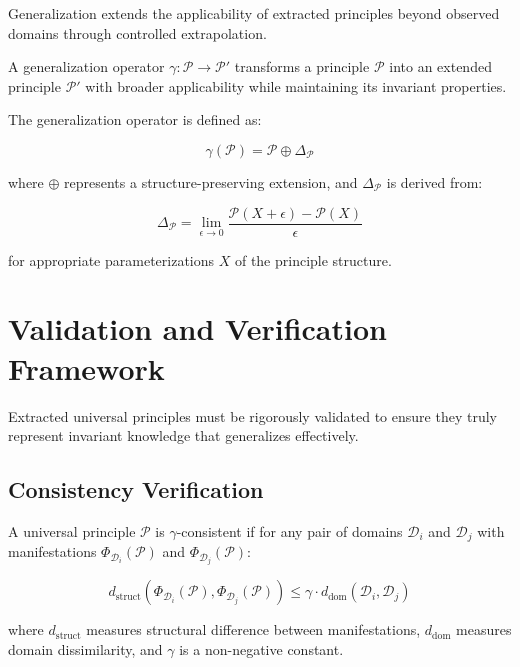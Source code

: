 Generalization extends the applicability of extracted principles beyond observed domains through controlled extrapolation.

\begin{definition}
A generalization operator $\gamma: \mathcal{P} \rightarrow \mathcal{P}'$ transforms a principle $\mathcal{P}$ into an extended principle $\mathcal{P}'$ with broader applicability while maintaining its invariant properties.
\end{definition}

The generalization operator is defined as:

\begin{equation}
\gamma(\mathcal{P}) = \mathcal{P} \oplus \Delta_{\mathcal{P}}
\end{equation}

where $\oplus$ represents a structure-preserving extension, and $\Delta_{\mathcal{P}}$ is derived from:

\begin{equation}
\Delta_{\mathcal{P}} = \lim_{\epsilon \rightarrow 0} \frac{\mathcal{P}(X + \epsilon) - \mathcal{P}(X)}{\epsilon}
\end{equation}

for appropriate parameterizations $X$ of the principle structure.

\section{Validation and Verification Framework}

Extracted universal principles must be rigorously validated to ensure they truly represent invariant knowledge that generalizes effectively.

\subsection{Consistency Verification}

\begin{theorem}
A universal principle $\mathcal{P}$ is $\gamma$-consistent if for any pair of domains $\mathcal{D}_i$ and $\mathcal{D}_j$ with manifestations $\Phi_{\mathcal{D}_i}(\mathcal{P})$ and $\Phi_{\mathcal{D}_j}(\mathcal{P})$:

\begin{equation}
d_{\text{struct}}(\Phi_{\mathcal{D}_i}(\mathcal{P}), \Phi_{\mathcal{D}_j}(\mathcal{P})) \leq \gamma \cdot d_{\text{dom}}(\mathcal{D}_i, \mathcal{D}_j)
\end{equation}

where $d_{\text{struct}}$ measures structural difference between manifestations, $d_{\text{dom}}$ measures domain dissimilarity, and $\gamma$ is a non-negative constant.
\end{theorem}


